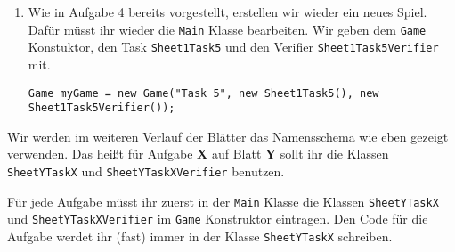 
\newcommand{\javadocRoot}{https://fius.github.io/ICGE2/master/} %


\begin{enumerate}
    \item Wie in Aufgabe 4 bereits vorgestellt, erstellen wir wieder ein neues Spiel. 
        Dafür müsst ihr wieder die \lstinline{Main} Klasse bearbeiten.
        Wir geben dem \lstinline{Game} Konstuktor, den Task \lstinline{Sheet1Task5} und den Verifier \lstinline{Sheet1Task5Verifier} mit.

    \begin{lstlisting}
Game myGame = new Game("Task 5", new Sheet1Task5(), new Sheet1Task5Verifier());
    \end{lstlisting}
\end{enumerate}


\begin{Infobox}
    Wir werden im weiteren Verlauf der Blätter das Namensschema wie eben gezeigt verwenden. 
    Das heißt für Aufgabe \textbf{X} auf Blatt \textbf{Y} sollt ihr die Klassen \lstinline{SheetYTaskX} und \lstinline{SheetYTaskXVerifier} benutzen.

    Für jede Aufgabe müsst ihr zuerst in der \lstinline{Main} Klasse die Klassen \lstinline{SheetYTaskX} und \lstinline{SheetYTaskXVerifier} im \lstinline{Game} Konstruktor eintragen.
    Den Code für die Aufgabe werdet ihr (fast) immer in der Klasse \lstinline{SheetYTaskX} schreiben.
\end{Infobox}


